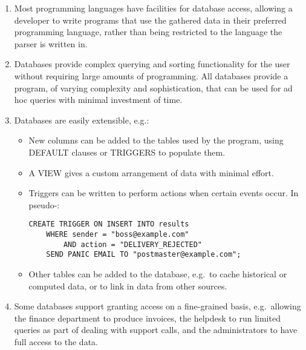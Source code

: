\begin{enumerate}

    \item Most programming languages have facilities for database access,
        allowing a developer to write programs that use the gathered data
        in their preferred programming language, rather than being
        restricted to the language the parser is written in.

    \item Databases provide complex querying and sorting functionality for
        the user without requiring large amounts of programming.  All
        databases provide a program, of varying complexity and
        sophistication, that can be used for ad hoc queries with minimal
        investment of time.

    \item Databases are easily extensible, e.g.:

        \begin{itemize}

            \item New columns can be added to the tables used by the
                program, using DEFAULT clauses or TRIGGERS to populate
                them.

            \item A VIEW gives a custom arrangement of data with minimal
                effort.

            \item Triggers can be written to perform actions when certain
                events occur.  In pseudo-\@:

\begin{verbatim}
CREATE TRIGGER ON INSERT INTO results
    WHERE sender = "boss@example.com"
        AND action = "DELIVERY_REJECTED"
    SEND PANIC EMAIL TO "postmaster@example.com";
\end{verbatim}

            \item Other tables can be added to the database, e.g.\ to cache
                historical or computed data, or to link in data from other
                sources.

        \end{itemize}

    \item Some databases support granting access on a fine-grained basis,
        e.g.\ allowing the finance department to produce invoices, the
        helpdesk to run limited queries as part of dealing with support
        calls, and the administrators to have full access to the data.



\end{enumerate}
